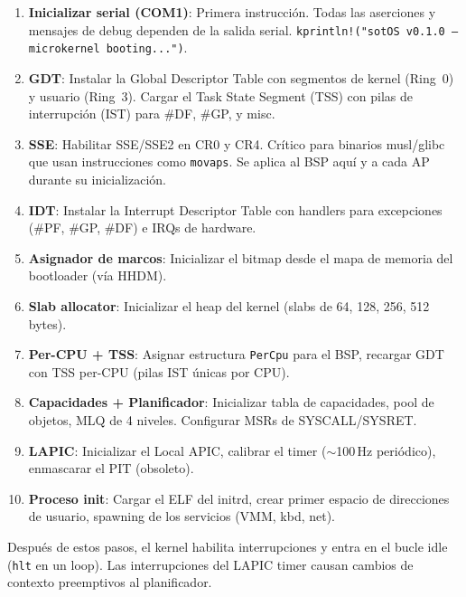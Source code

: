 \documentclass[11pt,twoside,openright]{book}
\theoremstyle{definition}
\theoremstyle{plain}
\theoremstyle{remark}
\begin{document}
\begin{enumerate}
    \item \textbf{Inicializar serial (COM1)}: Primera instrucción. Todas las
          aserciones y mensajes de debug dependen de la salida serial.
          \texttt{kprintln!("sotOS v0.1.0 --- microkernel booting...")}.

    \item \textbf{GDT}: Instalar la Global Descriptor Table con segmentos
          de kernel (Ring~0) y usuario (Ring~3). Cargar el Task State Segment (TSS)
          con pilas de interrupción (IST) para \#DF, \#GP, y misc.

    \item \textbf{SSE}: Habilitar SSE/SSE2 en CR0 y CR4. Crítico para binarios
          musl/glibc que usan instrucciones como \texttt{movaps}. Se aplica al
          BSP aquí y a cada AP durante su inicialización.

    \item \textbf{IDT}: Instalar la Interrupt Descriptor Table con handlers para
          excepciones (\#PF, \#GP, \#DF) e IRQs de hardware.

    \item \textbf{Asignador de marcos}: Inicializar el bitmap desde el mapa de
          memoria del bootloader (vía HHDM).

    \item \textbf{Slab allocator}: Inicializar el heap del kernel (slabs de
          64, 128, 256, 512 bytes).

    \item \textbf{Per-CPU + TSS}: Asignar estructura \texttt{PerCpu} para el BSP,
          recargar GDT con TSS per-CPU (pilas IST únicas por CPU).

    \item \textbf{Capacidades + Planificador}: Inicializar tabla de capacidades,
          pool de objetos, MLQ de 4 niveles. Configurar MSRs de SYSCALL/SYSRET.

    \item \textbf{LAPIC}: Inicializar el Local APIC, calibrar el timer
          ($\sim$100\,Hz periódico), enmascarar el PIT (obsoleto).

    \item \textbf{Proceso init}: Cargar el ELF del initrd, crear primer espacio
          de direcciones de usuario, spawning de los servicios (VMM, kbd, net).
\end{enumerate}

Después de estos pasos, el kernel habilita interrupciones y entra en el bucle
idle (\texttt{hlt} en un loop). Las interrupciones del LAPIC timer causan cambios
de contexto preemptivos al planificador.
\end{document}
